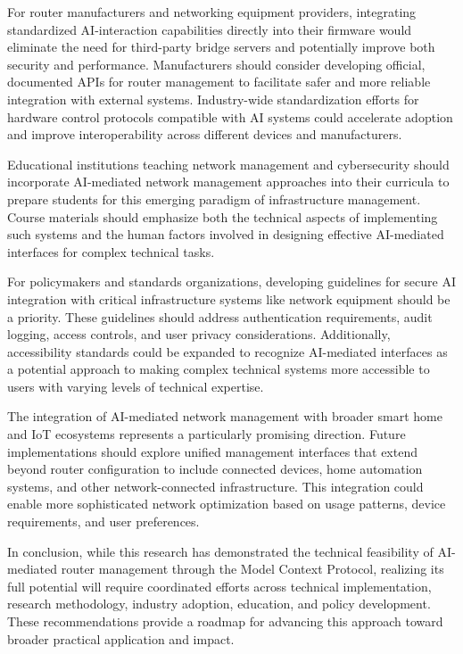 For router manufacturers and networking equipment providers, integrating standardized AI-interaction capabilities directly into their firmware would eliminate the need for third-party bridge servers and potentially improve both security and performance. Manufacturers should consider developing official, documented APIs for router management to facilitate safer and more reliable integration with external systems. Industry-wide standardization efforts for hardware control protocols compatible with AI systems could accelerate adoption and improve interoperability across different devices and manufacturers.

Educational institutions teaching network management and cybersecurity should incorporate AI-mediated network management approaches into their curricula to prepare students for this emerging paradigm of infrastructure management. Course materials should emphasize both the technical aspects of implementing such systems and the human factors involved in designing effective AI-mediated interfaces for complex technical tasks.

For policymakers and standards organizations, developing guidelines for secure AI integration with critical infrastructure systems like network equipment should be a priority. These guidelines should address authentication requirements, audit logging, access controls, and user privacy considerations. Additionally, accessibility standards could be expanded to recognize AI-mediated interfaces as a potential approach to making complex technical systems more accessible to users with varying levels of technical expertise.

The integration of AI-mediated network management with broader smart home and IoT ecosystems represents a particularly promising direction. Future implementations should explore unified management interfaces that extend beyond router configuration to include connected devices, home automation systems, and other network-connected infrastructure. This integration could enable more sophisticated network optimization based on usage patterns, device requirements, and user preferences.

In conclusion, while this research has demonstrated the technical feasibility of AI-mediated router management through the Model Context Protocol, realizing its full potential will require coordinated efforts across technical implementation, research methodology, industry adoption, education, and policy development. These recommendations provide a roadmap for advancing this approach toward broader practical application and impact.
